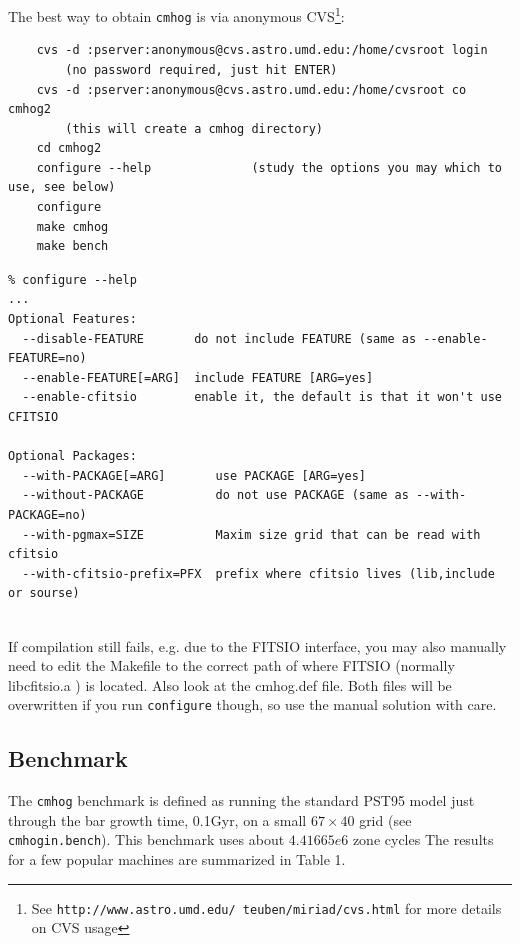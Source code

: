 \documentclass[10pt,dvips]{article}
\begin{document}
The best way to obtain {\tt cmhog} is via 
anonymous CVS\footnote{See {\tt http://www.astro.umd.edu/~teuben/miriad/cvs.html}
for more details on CVS usage}: 

\begin{verbatim}
	cvs -d :pserver:anonymous@cvs.astro.umd.edu:/home/cvsroot login
		(no password required, just hit ENTER)
	cvs -d :pserver:anonymous@cvs.astro.umd.edu:/home/cvsroot co cmhog2
		(this will create a cmhog directory)
	cd cmhog2
	configure --help              (study the options you may which to use, see below)
	configure
	make cmhog
	make bench

\end{verbatim}


\begin{verbatim}
% configure --help
...
Optional Features:
  --disable-FEATURE       do not include FEATURE (same as --enable-FEATURE=no)
  --enable-FEATURE[=ARG]  include FEATURE [ARG=yes]
  --enable-cfitsio        enable it, the default is that it won't use CFITSIO
 
Optional Packages:
  --with-PACKAGE[=ARG]       use PACKAGE [ARG=yes]
  --without-PACKAGE          do not use PACKAGE (same as --with-PACKAGE=no)
  --with-pgmax=SIZE          Maxim size grid that can be read with cfitsio
  --with-cfitsio-prefix=PFX  prefix where cfitsio lives (lib,include or sourse)
 
\end{verbatim}

If compilation still fails, e.g. due to the FITSIO interface, you may also manually need to edit
the Makefile to the correct path of where FITSIO (normally libcfitsio.a ) is located. Also
look at the cmhog.def file. Both files will be overwritten if you run {\tt configure} though, so
use the manual solution with care.


\newpage
\subsection{Benchmark}

The  {\tt cmhog} benchmark is defined as running the
standard PST95 model just through the bar growth time, 0.1Gyr,
on a small $67 \times 40$ grid (see {\tt cmhogin.bench}). This
benchmark uses about $4.41665e6$ zone cycles
The results for a few popular machines are summarized
in Table 1.
\end{document}
